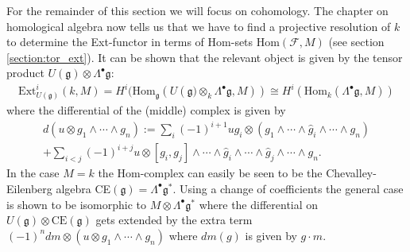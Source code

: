     For the remainder of this section we will focus on cohomology. The chapter on homological algebra now tells us that we have to find a projective resolution of $k$ to determine the Ext-functor in terms of Hom-sets Hom$(\mathcal{F}, M)$ (see section \ref{section:tor_ext}). It can be shown that the relevant object is given by the tensor product $U(\mathfrak{g})\otimes\Lambda^\bullet\mathfrak{g}$:
    \begin{gather}
        \text{Ext}^i_{U(\mathfrak{g})}(k, M) = H^i(\text{Hom}_{\mathfrak{g}}(U(\mathfrak{g)}\otimes_k\Lambda^\bullet\mathfrak{g}, M)) \cong H^i(\text{Hom}_k(\Lambda^\bullet\mathfrak{g}, M))
    \end{gather}
    where the differential of the (middle) complex is given by
    \begin{gather}
        d(u\otimes g_1\wedge\cdots\wedge g_n) := \sum_i(-1)^{i+1}ug_i\otimes(g_1\wedge\cdots\wedge\hat{g}_i\wedge\cdots\wedge g_n)\\+ \sum_{i<j}(-1)^{i+j}u\otimes[g_i,g_j]\wedge\cdots\wedge\hat{g}_i\wedge\cdots\wedge\hat{g}_j\wedge\cdots\wedge g_n.\nonumber
    \end{gather}
    In the case $M=k$ the Hom-complex can easily be seen to be the Chevalley-Eilenberg algebra CE$(\mathfrak{g})=\Lambda^\bullet\mathfrak{g}^*$. Using a change of coefficients the general case is shown to be isomorphic to $M\otimes\Lambda^\bullet\mathfrak{g}^*$ where the differential on $U(\mathfrak{g})\otimes\text{CE}(\mathfrak{g})$ gets extended by the extra term $(-1)^n dm\otimes (u\otimes g_1\wedge\cdots\wedge g_n)$ where $dm(g)$ is given by $g\cdot m$.



